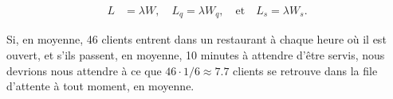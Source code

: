 \begin{align*}
L &=  \lambda W, \quad L_{q} = \lambda W_{q}, \quad\mbox{et}
\quad L_{s}= \lambda W_{s}.
\end{align*}
\begin{Example} Si, en moyenne, 46 clients entrent dans un restaurant à chaque heure où il est ouvert, et s'ils passent, en moyenne, 10 minutes à attendre d'être servis, nous devrions nous attendre à ce que $46\cdot 1/6 \approx 7.7$ clients se retrouve dans la file d'attente à tout moment, en moyenne. \end{Example}


